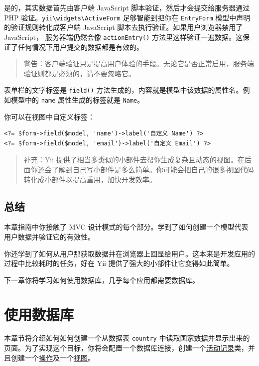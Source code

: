 是的，其实数据首先由客户端 JavaScript 脚本验证，然后才会提交给服务器通过 PHP 验证。\texttt{yii{\allowbreak{}\textbackslash}widgets{\allowbreak{}\textbackslash}ActiveForm} 足够智能到把你在 \lstinline|EntryForm| 模型中声明的验证规则转化成客户端 JavaScript 脚本去执行验证。如果用户浏览器禁用了 JavaScript， 服务器端仍然会像 \lstinline|actionEntry()| 方法里这样验证一遍数据。这保证了任何情况下用户提交的数据都是有效的。

\begin{quote}警告：客户端验证只是提高用户体验的手段。无论它是否正常启用，服务端验证则都是必须的，请不要忽略它。

\end{quote}
表单栏的文字标签是 \lstinline|field()| 方法生成的，内容就是模型中该数据的属性名。例如模型中的 \lstinline|name| 属性生成的标签就是 \lstinline|Name|。

你可以在视图中自定义标签：

\lstset{language=php}\begin{lstlisting}
<?= $form->field($model, 'name')->label('自定义 Name') ?>
<?= $form->field($model, 'email')->label('自定义 Email') ?>
\end{lstlisting}
\begin{quote}补充：Yii 提供了相当多类似的小部件去帮你生成复杂且动态的视图。在后面你还会了解到自己写小部件是多么简单。你可能会把自己的很多视图代码转化成小部件以提高重用，加快开发效率。

\end{quote}
\subsection{总结 \label{start-forms.md::summary}}
本章指南中你接触了 MVC 设计模式的每个部分。学到了如何创建一个模型代表用户数据并验证它的有效性。

你还学到了如何从用户那获取数据并在浏览器上回显给用户。这本来是开发应用的过程中比较耗时的任务，好在 Yii 提供了强大的小部件让它变得如此简单。

下一章你将学习如何使用数据库，几乎每个应用都需要数据库。



\label{start-databases.md}\section{使用数据库}
本章节将介绍如何如何创建一个从数据表 \lstinline|country| 中读取国家数据并显示出来的页面。为了实现这个目标，你将会配置一个数据库连接，创建一个\hyperref[db-active-record.md]{活动记录}类，并且创建一个\hyperref[structure-controllers.md]{操作}及一个\hyperref[structure-views.md]{视图}。

